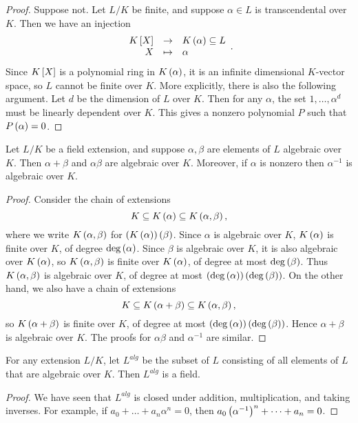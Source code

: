 \begin{proof}
Suppose not. Let $ L / K $ be finite, and suppose $ \alpha \in L $ is transcendental over $ K $. Then we have an injection
$$ \function{K\sb{X}}{K\rb{\alpha} \subseteq L}{X}{\alpha}. $$
Since $ K\sb{X} $ is a polynomial ring in $ K\rb{\alpha} $, it is an infinite dimensional $ K $-vector space, so $ L $ cannot be finite over $ K $. More explicitly, there is also the following argument. Let $ d $ be the dimension of $ L $ over $ K $. Then for any $ \alpha $, the set $ 1, \dots, \alpha^d $ must be linearly dependent over $ K $. This gives a nonzero polynomial $ P $ such that $ P\rb{\alpha} = 0 $.
\end{proof}

\begin{corollary}
Let $ L / K $ be a field extension, and suppose $ \alpha, \beta $ are elements of $ L $ algebraic over $ K $. Then $ \alpha + \beta $ and $ \alpha\beta $ are algebraic over $ K $. Moreover, if $ \alpha $ is nonzero then $ \alpha^{-1} $ is algebraic over $ K $.
\end{corollary}

\begin{proof}
Consider the chain of extensions
$$ K \subseteq K\rb{\alpha} \subseteq K\rb{\alpha, \beta}, $$
where we write $ K\rb{\alpha, \beta} $ for $ \rb{K\rb{\alpha}}\rb{\beta} $. Since $ \alpha $ is algebraic over $ K $, $ K\rb{\alpha} $ is finite over $ K $, of degree $ \deg\rb{\alpha} $. Since $ \beta $ is algebraic over $ K $, it is also algebraic over $ K\rb{\alpha} $, so $ K\rb{\alpha, \beta} $ is finite over $ K\rb{\alpha} $, of degree at most $ \deg\rb{\beta} $. Thus $ K\rb{\alpha, \beta} $ is algebraic over $ K $, of degree at most $ \rb{\deg\rb{\alpha}}\rb{\deg\rb{\beta}} $. On the other hand, we also have a chain of extensions
$$ K \subseteq K\rb{\alpha + \beta} \subseteq K\rb{\alpha, \beta}, $$
so $ K\rb{\alpha + \beta} $ is finite over $ K $, of degree at most $ \rb{\deg\rb{\alpha}}\rb{\deg\rb{\beta}} $. Hence $ \alpha + \beta $ is algebraic over $ K $. The proofs for $ \alpha\beta $ and $ \alpha^{-1} $ are similar.
\end{proof}

\begin{corollary}
For any extension $ L / K $, let $ L^{alg} $ be the subset of $ L $ consisting of all elements of $ L $ that are algebraic over $ K $. Then $ L^{alg} $ is a field.
\end{corollary}

\begin{proof}
We have seen that $ L^{alg} $ is closed under addition, multiplication, and taking inverses. For example, if $ a_0 + \dots + a_n\alpha^n = 0 $, then $ a_0\rb{\alpha^{-1}}^n + \dots + a_n = 0 $.
\end{proof}

